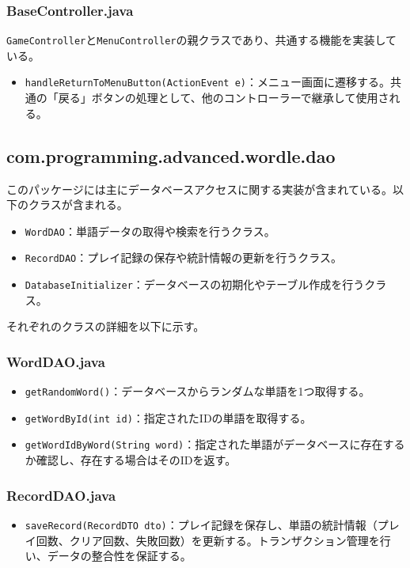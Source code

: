 \documentclass[a4j]{ujarticle}
\begin{document}
\subsubsection{BaseController.java}
\texttt{GameController}と\texttt{MenuController}の親クラスであり、共通する機能を実装している。

\begin{itemize}
\item \texttt{handleReturnToMenuButton(ActionEvent e)}：メニュー画面に遷移する。共通の「戻る」ボタンの処理として、他のコントローラーで継承して使用される。
\end{itemize}

\subsection{com.programming.advanced.wordle.dao}
このパッケージには主にデータベースアクセスに関する実装が含まれている。以下のクラスが含まれる。
\begin{itemize}
  \item \texttt{WordDAO}：単語データの取得や検索を行うクラス。
  \item \texttt{RecordDAO}：プレイ記録の保存や統計情報の更新を行うクラス。
  \item \texttt{DatabaseInitializer}：データベースの初期化やテーブル作成を行うクラス。
\end{itemize}

それぞれのクラスの詳細を以下に示す。

\subsubsection{WordDAO.java}
\begin{itemize}
  \item \texttt{getRandomWord()}：データベースからランダムな単語を1つ取得する。
  \item \texttt{getWordById(int id)}：指定されたIDの単語を取得する。
  \item \texttt{getWordIdByWord(String word)}：指定された単語がデータベースに存在するか確認し、存在する場合はそのIDを返す。
\end{itemize}

\subsubsection{RecordDAO.java}
\begin{itemize}
  \item \texttt{saveRecord(RecordDTO dto)}：プレイ記録を保存し、単語の統計情報（プレイ回数、クリア回数、失敗回数）を更新する。トランザクション管理を行い、データの整合性を保証する。
\end{itemize}
\end{document}
